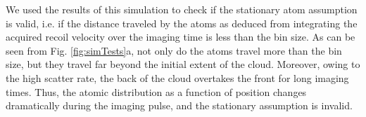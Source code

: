 \documentclass[12pt]{iopart}
\begin{document}
\par We used the results of this simulation to check if the stationary atom assumption is valid, i.e. if the distance traveled by the atoms as deduced from integrating the acquired recoil velocity over the imaging time is less than the bin size. As can be seen from Fig. \ref{fig:simTests}a, not only do the atoms travel more than the bin size, but they travel far beyond the initial extent of the cloud. Moreover, owing to the high scatter rate, the back of the cloud overtakes the front for long imaging times. Thus, the atomic distribution as a function of position changes dramatically during the imaging pulse, and the stationary assumption is invalid. 
\begin{figure}

\end{figure}
\end{document}
